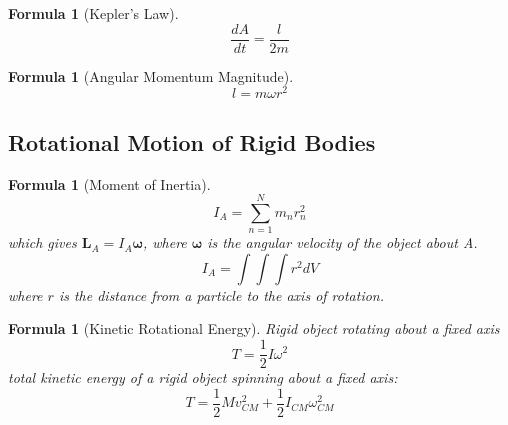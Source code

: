 \documentclass[12pt]{article}
\newtheorem{for}[thm]{Formula}
\theoremstyle{definition}
\theoremstyle{remark}
\numberwithin{equation}{section}
\newcommand\B[1]{\textbf{#1}}
\begin{document}
\vspace{15pt}

\begin{for}[Kepler's Law]
         \begin{equation}
                \frac{dA}{dt} = \frac{l}{2m}
        \end{equation}
\end{for}


\vspace{15pt}

\begin{for}[Angular Momentum Magnitude]
        \begin{equation}
                l = m\omega r^2
        \end{equation}
\end{for}

\vspace{15pt}


\subsection{Rotational Motion of Rigid Bodies}


\begin{for}[Moment of Inertia]
        \begin{equation}
                I_A = \sum\limits_{n=1}^Nm_nr_n^2
        \end{equation}
        which gives $\B{L}_A = I_A\boldsymbol{\omega}$, where $\boldsymbol{\omega}$ is the angular velocity of the object about A.\begin{equation}
                I_A = \int\int\int r^2 dV
        \end{equation}
        where $r$ is the distance from a particle to the axis of rotation.
\end{for}

\vspace{15pt}

\begin{for}[Kinetic Rotational Energy]
        Rigid object rotating about a fixed axis\begin{equation}
                T = \frac{1}{2}I\omega^2
        \end{equation}
        total kinetic energy of a rigid object spinning about a fixed axis: \begin{equation}
                T = \frac{1}{2}Mv_{CM}^2 + \frac{1}{2}I_{CM}\omega_{CM}^2
        \end{equation}
\end{for}
\end{document}
